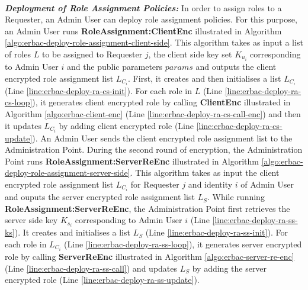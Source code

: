 \documentclass[epsfig,a4paper,11pt,titlepage]{book}
\numberwithin{algorithm}{chapter}
\begin{document}
\noindent \\
\noindent \emph{\textbf{Deployment of Role Assignment Policies:}} 
In order to assign roles to a Requester, an Admin User can deploy role assignment policies. For this purpose, an Admin User runs \textbf{RoleAssignment:ClientEnc} illustrated in Algorithm \ref{algo:erbac-deploy-role-assignment-client-side}. This algorithm takes as input a list of roles $L$ to be assigned to Requester $j$, the client side key set $K_{u_i}$ corresponding to Admin User $i$ and the public parameters $params$ and outputs the client encrypted role assignment list $L_{C_i}$. First, it creates and then initialises a list $L_{C_i}$ (Line \ref{line:erbac-deploy-ra-cs-init}). For each role in $L$ (Line \ref{line:erbac-deploy-ra-cs-loop}), it generates client encrypted role by calling \textbf{ClientEnc} illustrated in Algorithm \ref{algo:erbac-client-enc} (Line \ref{line:erbac-deploy-ra-cs-call-enc}) and then it updates $L_{C_i}$ by adding client encrypted role (Line \ref{line:erbac-deploy-ra-cs-update}). An Admin User sends the client encrypted role assignment list to the Administration Point. 
During the second round of encryption, the Administration Point runs \textbf{RoleAssignment:ServerReEnc} illustrated in Algorithm \ref{algo:erbac-deploy-role-assignment-server-side}. This algorithm takes as input the client encrypted role assignment list $L_{C_i}$ for Requester $j$ and identity $i$ of Admin User and ouputs the server encrypted role assignment list $L_{S}$. While running \textbf{RoleAssignment:ServerReEnc}, the Administration Point first retrieves the server side key $K_{s_i}$ corresponding to Admin User $i$ (Line \ref{line:erbac-deploy-ra-ss-ks}). It creates and initialises a list $L_{S}$ (Line \ref{line:erbac-deploy-ra-ss-init}). For each role in $L_{C_i}$ (Line \ref{line:erbac-deploy-ra-ss-loop}), it generates server encrypted role by calling \textbf{ServerReEnc} illustrated in Algorithm \ref{algo:erbac-server-re-enc} (Line \ref{line:erbac-deploy-ra-ss-call}) and updates $L_{S}$ by adding the server encrypted role (Line \ref{line:erbac-deploy-ra-ss-update}).
\end{document}
